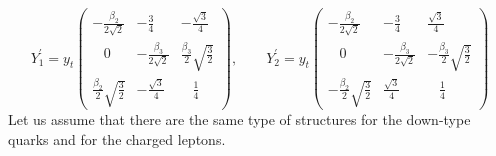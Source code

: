 \documentclass[12pt]{article}
\begin{document}
\begin{equation}
Y_1^\prime = y_t \left (\begin{array}{ccc} -\frac{\beta_2}{2\sqrt{2}}& -\frac{3}{4} & -\frac{\sqrt{3}}{4} \\ \;\;\; 0 &  -\frac{\beta_3}{2\sqrt{2}} & \frac{\beta_3}{2}\sqrt{\frac{3}{2}}\\ \frac{\beta_2}{2}\sqrt{\frac{3}{2}} & -\frac{\sqrt{3}}{4} & \;\;\; \frac{1}{4} \end{array} \right ),\qquad 
Y_2^\prime = y_t\left (\begin{array}{ccc}  -\frac{\beta_2}{2\sqrt{2}}& -\frac{3}{4} & \frac{\sqrt{3}}{4} \\ \;\;\; 0 &  -\frac{\beta_3}{2\sqrt{2}} & -\frac{\beta_3}{2}\sqrt{\frac{3}{2}}\\ -\frac{\beta_2}{2}\sqrt{\frac{3}{2}} & \frac{\sqrt{3}}{4} & \;\;\; \frac{1}{4} \end{array} \right )
\end{equation}
Let us assume that there are the same type of structures for the down-type quarks and for the charged leptons. 
\end{document}
